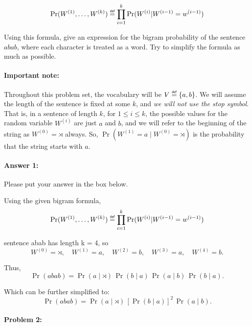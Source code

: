 \documentclass[10pt]{article}
\newenvironment{AnswerBox}{\begin{mdframed}[style=simple]}{\end{mdframed}}
\newcommand\defeq{\mathrel{\overset{\makebox[0pt]{\mbox{\normalfont\tiny\sffamily def}}}{=}}}
\begin{document}
\begin{equation}\label{eq:bigram}
\Pr(W^{(1)},\dots,W^{(k)})
\defeq\prod_{i=1}^k \Pr(W^{(i)} | W^{(i-1)}=w^{(i-1)})
\end{equation}

 Using this formula, give an expression for the bigram
probability of the sentence $abab$, where each character is treated as
a word. Try to simplify the formula as much as possible.

\paragraph{Important note:} Throughout this problem set, the vocabulary will be
$V\defeq\{a,b\}$. We will assume the length of the sentence is fixed at some $k$,
and \emph{we will not use the stop symbol}.  
That is, in a sentence of length $k$, for $1 \le i \le k$, the possible
values for the random variable $W^{(i)}$ are just $a$ and $b$, and we 
will refer to the beginning of the string as  $W^{(0)} = \rtimes$ always.
So, $\Pr(W^{(1)}=a \mid W^{(0)}=\rtimes)$ is
the probability that the string starts with $a$.

\paragraph{Answer 1:} Please put your answer in the box below.

\begin{AnswerBox}%

    Using the given bigram formula,
    \[
    \Pr(W^{(1)}, \dots ,W^{(k)})
    \defeq \prod_{i=1}^k \Pr(W^{(i)} | W^{(i-1)}=w^{(i-1)})
    \]

    sentence abab has length k = 4, so
    \[
    W^{(0)} = \rtimes,\quad 
    W^{(1)} = a,\quad 
    W^{(2)} = b,\quad 
    W^{(3)} = a,\quad 
    W^{(4)} = b.
    \]
    
    Thus,
    \[
    \Pr(abab)
    = \Pr(a \mid \rtimes)\, \Pr(b \mid a)\, \Pr(a \mid b)\, \Pr(b \mid a).
    \]
    
    Which can be further simplified to:
    \[ \Pr(abab) = \Pr(a \mid \rtimes)\,[\Pr(b \mid a)]^{2}\,\Pr(a \mid b). \]

\end{AnswerBox}%

\hrulefill %

\paragraph{Problem 2:}
\end{document}

